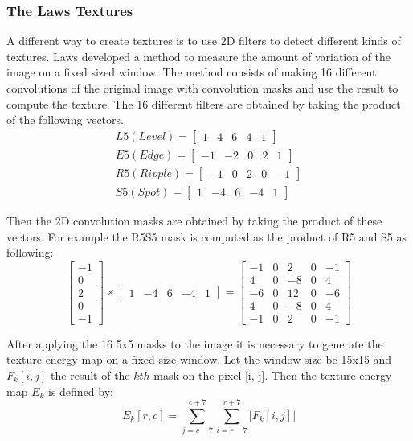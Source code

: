 \subsubsection{The Laws Textures}
\label{sec:Laws_Textures}

A different way to create textures is to use 2D filters to detect different kinds of textures. Laws developed a method to measure the amount of variation of the image on a fixed sized window. The method consists of making 16 different convolutions of the original image with convolution masks and use the result to compute the texture. The 16 different filters are obtained by taking the product of the following vectors.
\begin{align}
L5 (Level) = 
\begin{bmatrix}
1&4&6&4&1
\end{bmatrix}\\
E5 (Edge) = 
\begin{bmatrix}
-1&-2&0&2&1
\end{bmatrix}\\
R5 (Ripple) = 
\begin{bmatrix}
-1&0&2&0&-1
\end{bmatrix}\\
S5 (Spot) = 
\begin{bmatrix}
1&-4&6&-4&1
\end{bmatrix}
\end{align}

Then the 2D convolution masks are obtained by taking the product of these vectors. For example the R5S5 mask is computed as the product of R5 and S5 as following:
\begin{equation}
\begin{bmatrix}
-1\\0\\2\\0\\-1
\end{bmatrix}
\times
\begin{bmatrix}
1&-4&6&-4&1
\end{bmatrix}
=
\begin{bmatrix}
-1&0&2&0&-1\\
4&0&-8&0&4\\
-6&0&12&0&-6\\
4&0&-8&0&4\\
-1&0&2&0&-1
\end{bmatrix}
\end{equation}

After applying the 16 5x5 masks to the image it is necessary to generate the texture energy map on a fixed size window. Let the window size be 15x15 and $F_k[i,j]$ the result of the $kth$ mask on the pixel [i, j]. Then the texture energy map $E_k$ is defined by:
\begin{equation}
E_k[r,c] = \sum_{j=c-7}^{c+7}\sum_{i=r-7}^{r+7} |F_k[i,j]|   
\end{equation}

